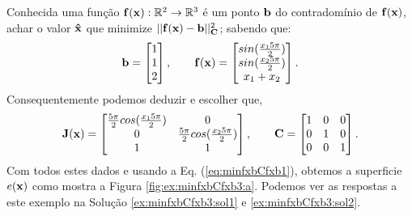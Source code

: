 \begin{example}
\label{ex:minfxbCfxb3}
Conhecida uma função $\VECTOR{f}(\VECTOR{x}) : \mathbb{R}^{2} \rightarrow \mathbb{R}^{3}$
é um ponto $\VECTOR{b}$ do contradomínio de $\VECTOR{f}(\VECTOR{x})$,
achar o valor $\VECTOR{\hat{x}}$ que minimize $||\VECTOR{f}(\VECTOR{x})-\VECTOR{b}||_{\MATRIX{C}}^2$;
sabendo que:
\begin{equation}
\VECTOR{b}=\begin{bmatrix}
1\\
1\\
2
\end{bmatrix},
\qquad 
\VECTOR{f}(\VECTOR{x})=\begin{bmatrix}
sin(\frac{x_1 5 \pi}{2})\\
sin(\frac{x_2 5 \pi}{2})\\
x_1+x_2
\end{bmatrix}.
\end{equation}
Consequentemente podemos deduzir e escolher que, 
\begin{equation}\label{eq:lab:ex2fx3}
\MATRIX{J}(\VECTOR{x})=\begin{bmatrix}
\frac{5 \pi}{2}cos(\frac{x_1 5 \pi}{2}) & 0\\
0 & \frac{5 \pi}{2}cos(\frac{x_2 5 \pi}{2}) \\
1 & 1
\end{bmatrix},
\qquad
\MATRIX{C}=\begin{bmatrix}
1 & 0 & 0\\
0 & 1 & 0\\
0 & 0 & 1
\end{bmatrix}.
\end{equation}
Com todos estes dados e usando a Eq. (\ref{eq:minfxbCfxb1}),
obtemos a superficie $e(\VECTOR{x})$ como mostra a Figura \ref{fig:ex:minfxbCfxb3:a}.
Podemos ver as respostas a este exemplo na Solução \ref{ex:minfxbCfxb3:sol1} e \ref{ex:minfxbCfxb3:sol2}.
\end{example}

